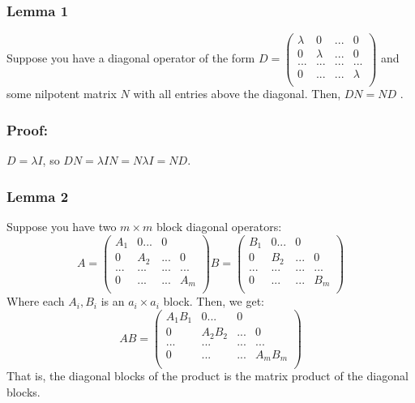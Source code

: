 \documentclass{article}
\begin{document}
\subsubsection*{Lemma 1}
Suppose you have a diagonal operator of the form $D =
\begin{pmatrix}
\lambda & 0 & ... & 0\\
0 & \lambda & ... & 0\\
... &... &... & ...\\
0 & ... & ... & \lambda\\
\end{pmatrix}
$ and some nilpotent matrix $N$ with all entries above the diagonal. Then, $DN = ND$ .
\subsubsection*{Proof:}
$D = \lambda I$, so $DN = \lambda IN = N\lambda I = ND$.
\subsubsection*{Lemma 2}
Suppose you have two $m \times m$ block diagonal operators:
\[
A = \begin{pmatrix} 
A_{1} & 0 ... & 0\\
0 & A_{2} & ... & 0\\
... &... &... & ...\\
0 & ... & ... & A_{m}\\
\end{pmatrix}
B = \begin{pmatrix}
B_{1} & 0 ... & 0\\
0 & B_{2} & ... & 0\\
... &... &... & ...\\
0 & ... & ... &B_{m}\\
\end{pmatrix}
\]
Where each $A_{i}, B_{i}$ is an $a_{i} \times a_{i}$ block. Then, we get:
\[
AB = \begin{pmatrix}
A_{1}B_{1} & 0 ... & 0\\
0 & A_{2}B_{2} & ... & 0\\
... &... &... & ...\\
0 & ... & ... & A_{m}B_{m}\\
\end{pmatrix}
\]
That is, the diagonal blocks of the product is the matrix product of the diagonal blocks.
\end{document}
